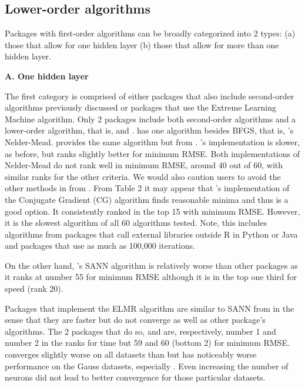 \hypertarget{lower-order-algorithms}{%
\subsection{Lower-order algorithms}\label{lower-order-algorithms}}

Packages with first-order algorithms can be broadly categorized into 2
types: (a) those that allow for one hidden layer (b) those that allow
for more than one hidden layer.

\textbf{A. One hidden layer}

The first category is comprised of either packages that also include
second-order algorithms previously discussed or packages that use the
Extreme Learning Machine algorithm. Only 2 packages include both
second-order algorithms and a lower-order algorithm, that is,
 and .  has one algorithm
besides BFGS, that is, 's Nelder-Mead. 
provides the same algorithm but from . 's
implementation is slower, as before, but ranks slightly better for
minimum RMSE. Both implementations of Nelder-Mead do not rank well in
minimum RMSE, around 40 out of 60, with similar ranks for the other
criteria. We would also caution users to avoid the other methods in
 from . From Table 2 it may appear that
's implementation of the Conjugate Gradient (CG) algorithm
finds reasonable minima and thus is a good option. It consistently
ranked in the top 15 with minimum RMSE. However, it is the slowest
algorithm of all 60 algorithms tested. Note, this includes algorithms
from packages that call external libraries outside R in Python or Java
and packages that use as much as 100,000 iterations.

On the other hand, 's SANN algorithm is relatively worse
than other packages as it ranks at number 55 for minimum RMSE although
it is in the top one third for speed (rank 20).

Packages that implement the ELMR algorithm are similar to SANN from
 in the sense that they are faster but do not converge as
well as other package's algorithms. The 2 packages that do so,
 \citep{R-elmNNRcpp} and 
\citep{R-ELMR} are, respectively, number 1 and number 2 in the ranks for
time but 59 and 60 (bottom 2) for minimum RMSE.  converges
slightly worse on all datasets than  but has noticeably
worse performance on the Gauss datasets, especially . Even
increasing the number of neurons did not lead to better convergence for
those particular datasets.


